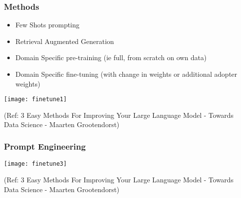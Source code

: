 \begin{frame}[fragile]\frametitle{Methods}
  \begin{itemize}
	\item Few Shots prompting
	\item Retrieval Augmented Generation
	\item Domain Specific pre-training (ie full, from scratch on own data)
	\item Domain Specific fine-tuning (with change in weights or additional adopter weights)
  \end{itemize}

		\begin{center}
		\texttt{[image: finetune1]}
		\end{center}

{\tiny (Ref: 3 Easy Methods For Improving Your Large Language Model - Towards Data Science - Maarten Grootendorst)}

\end{frame}

\begin{frame}[fragile]\frametitle{Prompt Engineering}


		\begin{center}
		\texttt{[image: finetune3]}
		\end{center}

{\tiny (Ref: 3 Easy Methods For Improving Your Large Language Model - Towards Data Science - Maarten Grootendorst)}

\end{frame}






